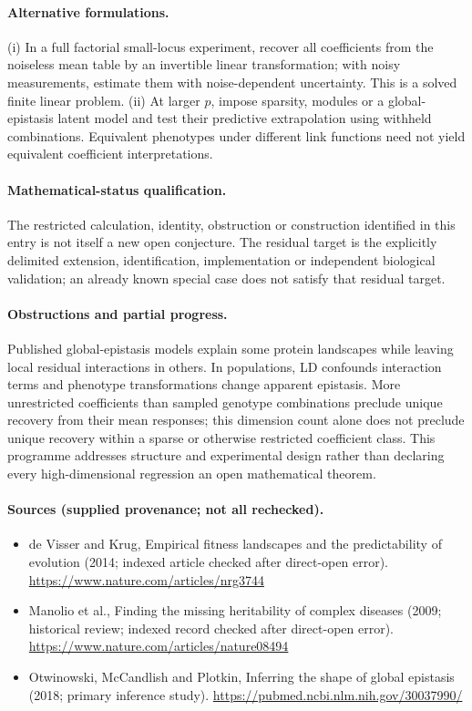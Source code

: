 \documentclass[11pt]{article}
\begin{document}
\paragraph{Alternative formulations.} (i) In a full factorial small-locus experiment, recover all coefficients from the noiseless mean table by an invertible linear transformation; with noisy measurements, estimate them with noise-dependent uncertainty. This is a solved finite linear problem. (ii) At larger $p$, impose sparsity, modules or a global-epistasis latent model and test their predictive extrapolation using withheld combinations. Equivalent phenotypes under different link functions need not yield equivalent coefficient interpretations.
\paragraph{Mathematical-status qualification.} The restricted calculation, identity, obstruction or construction identified in this entry is not itself a new open conjecture. The residual target is the explicitly delimited extension, identification, implementation or independent biological validation; an already known special case does not satisfy that residual target.

\paragraph{Obstructions and partial progress.} Published global-epistasis models explain some protein landscapes while leaving local residual interactions in others. In populations, LD confounds interaction terms and phenotype transformations change apparent epistasis. More unrestricted coefficients than sampled genotype combinations preclude unique recovery from their mean responses; this dimension count alone does not preclude unique recovery within a sparse or otherwise restricted coefficient class. This programme addresses structure and experimental design rather than declaring every high-dimensional regression an open mathematical theorem.
\paragraph{Sources (supplied provenance; not all rechecked).}
\begin{itemize}
\item de Visser and Krug, Empirical fitness landscapes and the predictability of evolution (2014; indexed article checked after direct-open error). \url{https://www.nature.com/articles/nrg3744}
\item Manolio et al., Finding the missing heritability of complex diseases (2009; historical review; indexed record checked after direct-open error). \url{https://www.nature.com/articles/nature08494}
\item Otwinowski, McCandlish and Plotkin, Inferring the shape of global epistasis (2018; primary inference study). \url{https://pubmed.ncbi.nlm.nih.gov/30037990/}
\end{itemize}
\end{document}
